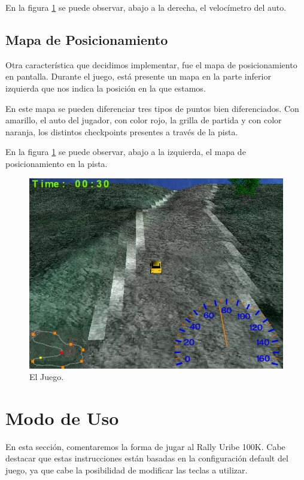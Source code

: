 \documentclass[a4paper,10pt]{article}
\begin{document}
En la figura \ref{fig:game} se puede observar, abajo a la derecha, el
veloc\'imetro del auto.

\subsection{Mapa de Posicionamiento}

Otra caracter\'istica que decidimos implementar, fue el mapa de posicionamiento
en pantalla.  Durante el juego, est\'a presente un mapa en la parte inferior
izquierda que nos indica la posici\'on en la que estamos.

En este mapa se pueden diferenciar tres tipos de puntos bien diferenciados. 
Con amarillo, el auto del jugador, con color rojo, la grilla de partida y con
color naranja, los distintos checkpoints presentes a trav\'es de la pista.

En la figura \ref{fig:game} se puede observar, abajo a la izquierda, el mapa de
posicionamiento en la pista.

\begin{figure}
 \centering
 \includegraphics[bb=0 0 640 480,scale=0.4,keepaspectratio=true]{./game.png}
 \caption{El Juego.}
 \label{fig:game}
\end{figure}


\section{Modo de Uso}
\label{mododeuso}
En esta secci\'on, comentaremos la forma de jugar al Rally Uribe 100K.  Cabe
destacar que estas instrucciones est\'an basadas en la configuraci\'on default
del
juego, ya que cabe la posibilidad de modificar las teclas a utilizar.
\end{document}
